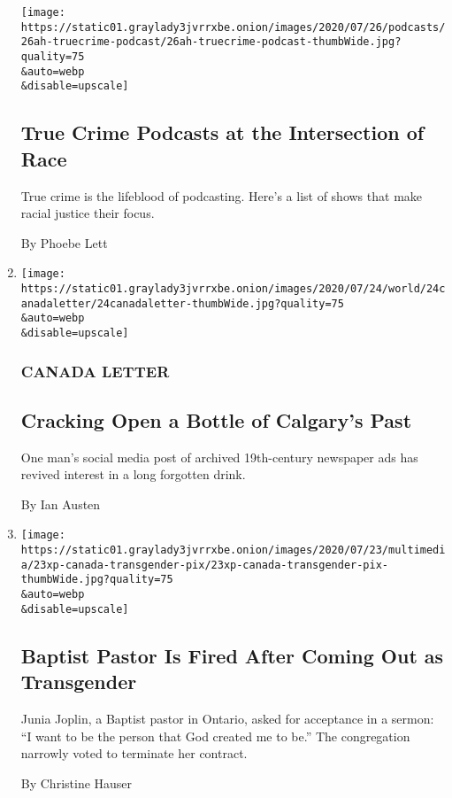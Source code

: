 \begin{enumerate}
  \texttt{[image: https://static01.graylady3jvrrxbe.onion/images/2020/07/26/podcasts/26ah-truecrime-podcast/26ah-truecrime-podcast-thumbWide.jpg?quality=75\\\&auto=webp\\\&disable=upscale]}

  \hypertarget{true-crime-podcasts-at-the-intersection-of-race}{%
  \subsection{True Crime Podcasts at the Intersection of
  Race}\label{true-crime-podcasts-at-the-intersection-of-race}}

  True crime is the lifeblood of podcasting. Here's a list of shows that
  make racial justice their focus.

  By Phoebe Lett
\item
  \href{/2020/07/24/world/canada/cronk.html}{}

  \texttt{[image: https://static01.graylady3jvrrxbe.onion/images/2020/07/24/world/24canadaletter/24canadaletter-thumbWide.jpg?quality=75\\\&auto=webp\\\&disable=upscale]}

  \hypertarget{canada-letter-1}{%
  \subsubsection{CANADA LETTER}\label{canada-letter-1}}

  \hypertarget{cracking-open-a-bottle-of-calgarys-past}{%
  \subsection{Cracking Open a Bottle of Calgary's
  Past}\label{cracking-open-a-bottle-of-calgarys-past}}

  One man's social media post of archived 19th-century newspaper ads has
  revived interest in a long forgotten drink.

  By Ian Austen
\item
  \href{/2020/07/23/world/canada/junia-joplin-transgender-lorne-park-baptist.html}{}

  \texttt{[image: https://static01.graylady3jvrrxbe.onion/images/2020/07/23/multimedia/23xp-canada-transgender-pix/23xp-canada-transgender-pix-thumbWide.jpg?quality=75\\\&auto=webp\\\&disable=upscale]}

  \hypertarget{baptist-pastor-is-fired-after-coming-out-as-transgender}{%
  \subsection{Baptist Pastor Is Fired After Coming Out as
  Transgender}\label{baptist-pastor-is-fired-after-coming-out-as-transgender}}

  Junia Joplin, a Baptist pastor in Ontario, asked for acceptance in a
  sermon: ``I want to be the person that God created me to be.'' The
  congregation narrowly voted to terminate her contract.

  By Christine Hauser
\end{enumerate}

